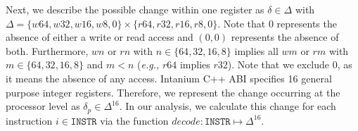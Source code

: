 Next, we describe the possible change within one register as $\delta \in \Delta$ with $\Delta = \{ w64, w32, w16, w8, 0 \} \times \{r64, r32, r16, r8, 0 \}$. 
Note that 0 represents 
the absence of either a write or read access and $(0, 0)$ represents the absence of both. Furthermore, $wn$ or $rn$ with $n \in \{64,32,16,8\}$ implies all $wm$ or $rm$ with $m \in 
\{64,32,16,8\}$ and $m < n$ (\textit{e.g.,} $r64$ implies $r32$). Note that we exclude 0, as it means the absence of any access.
Intanium C++ ABI specifies 16 general purpose integer registers. Therefore, we represent the change occurring at the processor level as $\delta_p \in \Delta^{16}$. 
In our analysis, we calculate this change for each instruction $i \in \texttt{INSTR}$ via the function $decode : \texttt{INSTR} \mapsto \Delta^{16}$.


%
%
%


